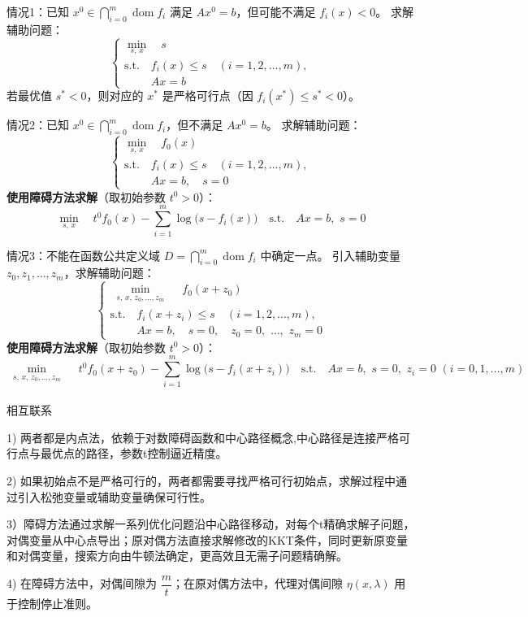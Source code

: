 \documentclass{article}
\newenvironment{solution_cn}{%
  \begin{proof}[解答]%
  \kaishu  %
}{%
  \end{proof}%
}
\begin{document}
\begin{solution_cn}
情况1：已知 \( x^0 \in \bigcap_{i=0}^m \mathop{\text{dom}} f_i \) 满足 \( A x^0 = b \)，但可能不满足 \( f_i(x) < 0 \)。  
求解辅助问题：  
\[
\begin{cases}
\min_{s, \, x} \quad s \\
\text{s.t.} \quad f_i(x) \leq s \quad (i=1,2,\dots,m), \\
\quad\quad\,\, A x = b
\end{cases}
\]  
若最优值 \( s^* < 0 \)，则对应的 \( x^* \) 是严格可行点（因 \( f_i(x^*) \leq s^* < 0 \)）。

情况2：已知 \( x^0 \in \bigcap_{i=0}^m \mathop{\text{dom}} f_i \)，但不满足 \( A x^0 = b \)。  
  求解辅助问题：  
  \[
  \begin{cases}
  \min_{s, \, x} \quad f_0(x) \\
  \text{s.t.} \quad f_i(x) \leq s \quad (i=1,2,\dots,m), \\
  \quad\quad\,\, A x = b, \quad s = 0
  \end{cases}
  \]  
  \textbf{使用障碍方法求解}（取初始参数 \( t^0 > 0 \)）：  
  \[
  \min_{s, \, x} \quad t^0 f_0(x) - \sum_{i=1}^m \log\bigl(s - f_i(x)\bigr) 
  \quad \text{s.t.} \quad A x = b, \,\, s = 0
  \]   

情况3：不能在函数公共定义域 \( D = \bigcap_{i=0}^m \mathop{\text{dom}} f_i \) 中确定一点。  
  引入辅助变量 \( z_0, z_1, \dots, z_m \)，求解辅助问题：  
  \[
  \begin{cases}
  \min_{\substack{s, \, x, \, z_0, \dots, z_m}} \quad f_0(x + z_0) \\
  \text{s.t.} \quad f_i(x + z_i) \leq s \quad (i=1,2,\dots,m), \\
  \quad\quad\,\, A x = b, \quad s = 0, \quad z_0 = 0, \,\,\dots,\,\, z_m = 0
  \end{cases}
  \]  
  \textbf{使用障碍方法求解}（取初始参数 \( t^0 > 0 \)）：  
  \[
  \min_{\substack{s, \, x, \, z_0, \dots, z_m}} \quad t^0 f_0(x + z_0) - \sum_{i=1}^m \log\bigl(s - f_i(x + z_i)\bigr) 
  \quad \text{s.t.} \quad A x = b, \,\, s = 0, \,\, z_i = 0 \,\, (i=0,1,\dots,m)
  \]  \\
相互联系

1) 两者都是内点法，依赖于对数障碍函数和中心路径概念,中心路径是连接严格可行点与最优点的路径，参数t控制逼近精度。

2) 如果初始点不是严格可行的，两者都需要寻找严格可行初始点，求解过程中通过引入松弛变量或辅助变量确保可行性。

3）障碍方法通过求解一系列优化问题沿中心路径移动，对每个t精确求解子问题，对偶变量从中心点导出；原对偶方法直接求解修改的KKT条件，同时更新原变量和对偶变量，搜索方向由牛顿法确定，更高效且无需子问题精确解。

4) 在障碍方法中，对偶间隙为 \( \dfrac{m}{t} \)；在原对偶方法中，代理对偶间隙 \( \eta(x, \lambda) \) 用于控制停止准则。
\end{solution_cn}
\end{document}
